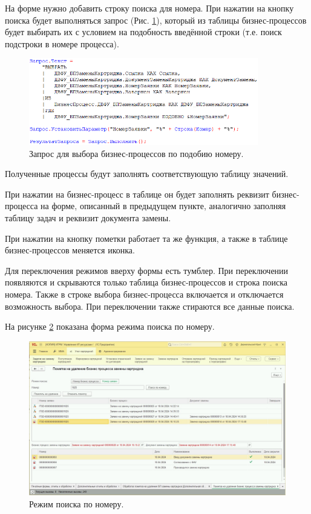     На форме нужно добавить строку поиска для номера. При нажатии на кнопку поиска будет выполняться запрос (Рис. \ref{query2}), который из таблицы бизнес-процессов будет выбирать их с условием на подобность введённой строки (т.е. поиск подстроки в номере процесса).
    
    \begin{figure}[H]
        \centering
        \includegraphics[width=10cm]{pictures/query2.png}
        \caption{Запрос для выбора бизнес-процессов по подобию номеру.}  \label{query2}
    \end{figure}
    
    Полученные процессы будут заполнять соответствующую таблицу значений. 

    При нажатии на бизнес-процесс в таблице он будет заполнять реквизит бизнес-процесса на форме, описанный в предыдущем пункте, аналогично заполняя таблицу задач и реквизит документа замены.

    При нажатии на кнопку пометки работает та же функция, а также в таблице бизнес-процессов меняется иконка.

    Для переключения режимов вверху формы есть тумблер. При переключении появляются и скрываются только таблица бизнес-процессов и строка поиска номера. Также в строке выбора бизнес-процесса включается и отключается возможность выбора. При переключении также стираются все данные поиска.

    На рисунке \ref{list} показана форма режима поиска по номеру.

    \begin{figure}[H]
        \centering
        \includegraphics[width=12cm]{pictures/interf_list.png}
        \caption{Режим поиска по номеру.}  \label{list}
    \end{figure}


